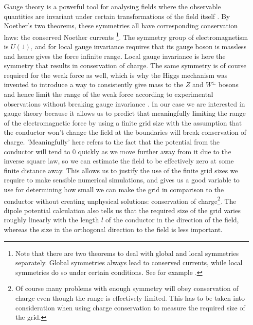 \documentclass[aps,twocolumn,pre,nofootinbib,10pt]{revtex4-1}
\begin{document}
Gauge theory is a powerful tool for analysing fields where the observable quantities are invariant under certain transformations of the field itself \cite{gaugetheory1}. By Noether's two theorems, these symmetries all have corresponding conservation laws: the conserved Noether currents \footnote{Note that there are two theorems to deal with global and local symmetries separately. Global symmetries always lead to conserved currents, while local symmetries do so under certain conditions. See for example \cite{gaugetheory2}.}. The symmetry group of electromagnetism is $U(1)$, and for local gauge invariance requires that its gauge boson is massless and hence gives the force infinite range. Local gauge invariance is here the symmetry that results in conservation of charge. The same symmetry is of course required for the weak force as well, which is why the Higgs mechanism was invented to introduce a way to consistently give mass to the 
$Z$ and $W^{\pm}$ bosons and hence limit the range of the weak force according to experimental observations without breaking gauge invariance \cite{gaugetheory3}. In our case we are interested in gauge theory because it allows us to predict that meaningfully limiting the range of the electromagnetic force by using a finite grid size with the assumption that the conductor won't change the field at the 
boundaries will break conservation of charge. 'Meaningfully' here refers to the fact that the potential from the conductor will tend to 0 quickly as we move further away from it due to the inverse square law, so we can estimate the field to be effectively zero at some finite distance away. This allows us to justify the use of the finite grid sizes we require to make sensible numerical simulations, and gives us a good variable to use for determining how small we can make the grid in comparison to the conductor without creating unphysical solutions: conservation of charge\footnote{Of course many problems with enough symmetry will obey conservation of charge even though the range is effectively limited. This has to be taken into consideration when using charge conservation to measure the required size of the grid.}. The dipole potential calculation also tells us that the required size of the grid varies roughly linearly with the length $l$ of the conductor in the direction of the field, whereas the size in the 
orthogonal direction to the field is less important.
\end{document}
